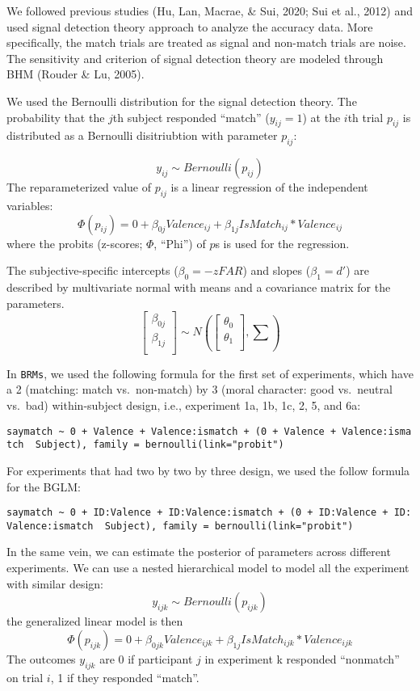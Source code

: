 \documentclass[
  man]{apa6}
\begin{document}
We followed previous studies (Hu, Lan, Macrae, \& Sui, 2020; Sui et al., 2012) and used signal detection theory approach to analyze the accuracy data. More specifically, the match trials are treated as signal and non-match trials are noise. The sensitivity and criterion of signal detection theory are modeled through BHM (Rouder \& Lu, 2005).

We used the Bernoulli distribution for the signal detection theory. The probability that the \(j\)th subject responded ``match'' (\(y_{ij} = 1\)) at the \(i\)th trial \(p_{ij}\) is distributed as a Bernoulli disitriubtion with parameter \(p_{ij}\):

\[ y_{ij} \sim Bernoulli(p_{ij})\]
The reparameterized value of \(p_{ij}\) is a linear regression of the independent variables:
\[ \Phi(p_{ij}) = 0 + \beta_{0j}Valence_{ij} + \beta_{1j}IsMatch_{ij} * Valence_{ij}\]
where the probits (z-scores; \(\Phi\), ``Phi'') of \(p\)s is used for the regression.

The subjective-specific intercepts (\(\beta_{0} = -zFAR\)) and slopes (\(\beta_{1} = d'\)) are described by multivariate normal with means and a covariance matrix for the parameters.
\[ \begin{bmatrix}\beta_{0j}\\
\beta_{1j}\\
\end{bmatrix} \sim N(\begin{bmatrix}\theta_{0}\\
\theta_{1}\\
\end{bmatrix}, \sum) \]

In \texttt{BRMs}, we used the following formula for the first set of experiments, which have a 2 (matching: match vs.~non-match) by 3 (moral character: good vs.~neutral vs.~bad) within-subject design, i.e., experiment 1a, 1b, 1c, 2, 5, and 6a:

\texttt{saymatch\ \textasciitilde{}\ 0\ +\ Valence\ +\ Valence:ismatch\ +\ (0\ +\ Valence\ +\ Valence:ismatch\ \textbar{}\ Subject),\ family\ =\ bernoulli(link="probit")}

For experiments that had two by two by three design, we used the follow formula for the BGLM:

\texttt{saymatch\ \textasciitilde{}\ 0\ +\ ID:Valence\ +\ ID:Valence:ismatch\ +\ (0\ +\ ID:Valence\ +\ ID:Valence:ismatch\ \textbar{}\ Subject),\ family\ =\ bernoulli(link="probit")}

In the same vein, we can estimate the posterior of parameters across different experiments. We can use a nested hierarchical model to model all the experiment with similar design:
\[y_{ijk} \sim Bernoulli(p_{ijk})\]
the generalized linear model is then
\[ \Phi(p_{ijk}) =  0 + \beta_{0jk}Valence_{ijk} + \beta_{1j}IsMatch_{ijk} * Valence_{ijk}\]
The outcomes \(y_{ijk}\) are 0 if participant \(j\) in experiment k responded ``nonmatch'' on trial \(i\), 1 if they responded ``match''.
\end{document}
